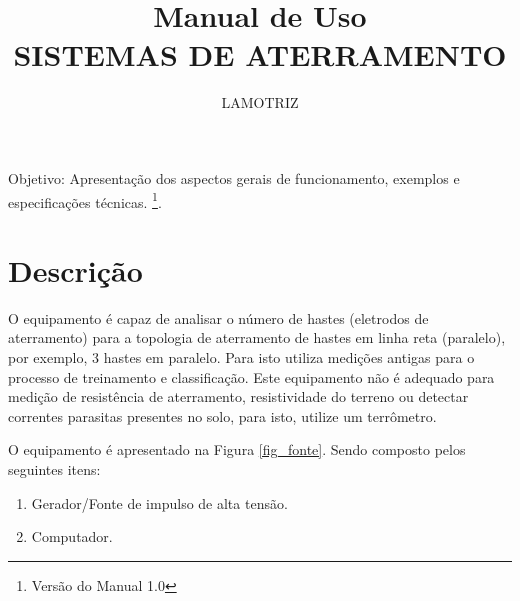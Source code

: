 \documentclass[a4paper, 10pt]{article}
\title{Manual de Uso\\SISTEMAS DE ATERRAMENTO}
\author{LAMOTRIZ}
\begin{document}
\maketitle

Objetivo: Apresentação dos aspectos gerais de funcionamento, 
exemplos e  especificações técnicas.
\footnote{Versão do Manual 1.0}.


\newpage

\tableofcontents

\newpage

\listoffigures

\newpage

\section{Descrição}

O equipamento é capaz de analisar o número de hastes
(eletrodos de aterramento) para a topologia de aterramento
de hastes em linha reta (paralelo), por exemplo, 3 hastes em paralelo. 
Para isto utiliza medições antigas para o processo de treinamento e 
classificação. Este equipamento não é adequado para medição de 
resistência de aterramento, resistividade do terreno ou detectar correntes 
parasitas presentes no solo, para isto, utilize um terrômetro. 

O equipamento é apresentado na Figura \ref{fig_fonte}. Sendo composto pelos 
seguintes itens:


\begin{enumerate}
    \item Gerador/Fonte de impulso de alta tensão.
    \item Computador.
\end{enumerate}
\end{document}
